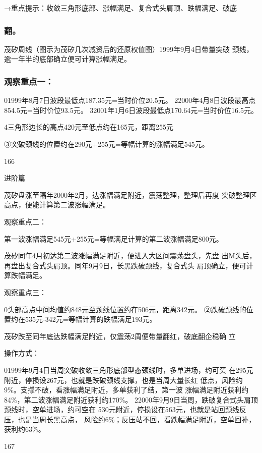 \documentclass{article}
\begin{document}
→重点提示：收敛三角形底部、涨幅满足、复合式头肩顶、跌幅满足、破底

\subsubsection{翻。}

茂矽周线（图示为茂矽几次减资后的还原权值图）1999年9月4日带量突破 颈线，逾一年半的底部确立便可计算涨幅满足。

\subsubsection{观察重点一：}

01999年8月7日波段最低点187.35元=当时价位20.5元。 22000年4月8日波段最高点854.5元=当时价位93.5元。 32001年1月6日波段最低点170.64元=当时价位16.5元。

4三角形边长的高点420元至低点约在165元，距离255元

③突破颈线的位置约在290元+255元=等幅计算的涨幅满足545元。

166

\clearpage

进阶篇

茂矽盘涨至隔年2000年2月，达涨幅满足附近，震荡整理，整理后再度 突破整理区高点，便能计算第二波涨幅满足。

观察重点二：

第一波涨幅满足545元+255元=等幅满足计算的第二波涨幅满足800元。

茂矽同年4月初达第二波涨幅满足附近，便进入大区间震荡盘头，先盘 出M头后，再盘出复合式头肩顶。同年9月9日，长黑跌破颈线，复合式头 肩顶确立，便可计算跌幅满足。

观察重点三：

0头部高点中间均值约848元至颈线位置约在506元，距离342元。 ②跌破颈线的位置约在535元-342元=等幅计算的跌幅满足193元。

茂矽跌至同年底达跌幅满足附近，仅震荡2周便带量翻红，破底翻企稳确 立

操作方式：

01999年9月4日当周突破收敛三角形底部型态颈线时，多单进场，约可买 在295元附近，停损设267元，也就是跌破颈线支撑，也是当周大量长红 低点，风险约9\%。支撑不破，看涨幅满足附近，多单获利了结，第一波 涨幅满足附近获利约84\%，第二波涨幅满足附近获利约170\%。 22000年9月9日当周，跌破复合式头肩顶颈线时，空单进场，约可空在 530元附近，停损设在563元，也就是站回颈线反压，也是当周长黑高点， 风险约6\%；反压站不回，看跌幅满足附近，空单回补，获利约63\%。

167
\end{document}
